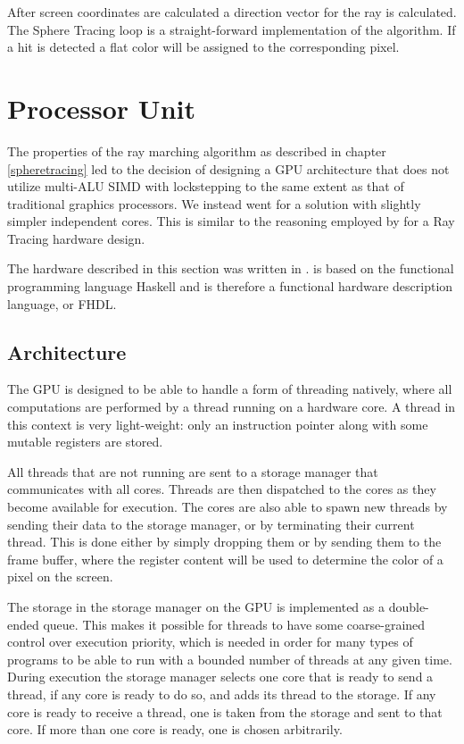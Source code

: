 			After screen coordinates are calculated a direction vector for the 
			ray is calculated. The Sphere Tracing loop is a straight-forward 
			implementation of the algorithm. If a hit is detected a flat color 
			will be assigned to the corresponding pixel.


	\section{Processor Unit} \label{implproc}

		The properties of the ray marching algorithm as described in chapter
		\ref{spheretracing} led to the decision of designing a GPU architecture
		that does not utilize multi-ALU SIMD with lockstepping to the same extent
		as that of traditional graphics processors. We instead went for a solution
		with slightly simpler independent cores. This is similar to the reasoning
		employed by \cite{Woop2005} for a Ray Tracing hardware design.

		The hardware described in this section was written in \clash. \clash is
		based on the functional programming language Haskell and is therefore a
		functional hardware description language, or FHDL.

		\subsection{Architecture}

			The GPU is designed to be able to handle a form of threading
			natively, where all computations are performed by a thread running
			on a hardware core. A thread in this context is very light-weight:
			only an instruction pointer along with some mutable registers are
			stored.

			All threads that are not running are sent to a storage manager that
			communicates with all cores. Threads are then dispatched to the 
			cores as they become available for execution. The cores are also 
			able to spawn new threads by sending their data to the storage 
			manager, or by terminating their current thread. This is done 
			either by simply dropping them or by sending them to the frame 
			buffer, where the register content will be used to determine the 
			color of a pixel on the screen.

			The storage in the storage manager on the GPU is implemented
			as a double-ended queue. This makes it possible for threads to have
			some coarse-grained control over execution priority, which is
			needed in order for many types of programs to be able to run with a
			bounded number of threads at any given time. During execution the
			storage manager selects one core that is ready to send a thread, if
			any core is ready to do so, and adds its thread to the storage. If
			any core is ready to receive a thread, one is taken from the 
			storage and sent to that core. If more than one core is ready, one
			is chosen arbitrarily.

